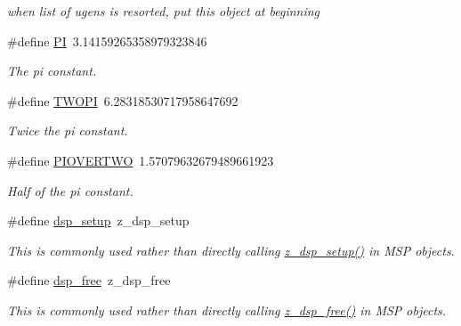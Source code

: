 \begin{DoxyCompactItemize}
\begin{DoxyCompactList}\small\item\em when list of ugens is resorted, put this object at beginning \item\end{DoxyCompactList}\item 
\#define \hyperlink{group__msp_ga598a3330b3c21701223ee0ca14316eca}{PI}~3.14159265358979323846
\begin{DoxyCompactList}\small\item\em The pi constant. \item\end{DoxyCompactList}\item 
\#define \hyperlink{group__msp_ga4912c64aec0c943b7985db6cb61ff83a}{TWOPI}~6.28318530717958647692
\begin{DoxyCompactList}\small\item\em Twice the pi constant. \item\end{DoxyCompactList}\item 
\#define \hyperlink{group__msp_ga54195c4fca76460ca07ba5101bcbc780}{PIOVERTWO}~1.57079632679489661923
\begin{DoxyCompactList}\small\item\em Half of the pi constant. \item\end{DoxyCompactList}\item 
\hypertarget{group__msp_gad15f054306792846a00a5f4e9e5426be}{
\#define \hyperlink{group__msp_gad15f054306792846a00a5f4e9e5426be}{dsp\_\-setup}~z\_\-dsp\_\-setup}
\label{group__msp_gad15f054306792846a00a5f4e9e5426be}

\begin{DoxyCompactList}\small\item\em This is commonly used rather than directly calling \hyperlink{group__msp_ga5c4d70cfb420f13386dd1473143e5825}{z\_\-dsp\_\-setup()} in MSP objects. \item\end{DoxyCompactList}\item 
\hypertarget{group__msp_ga9a981adf6eea7e55d11c1a0b02592a6e}{
\#define \hyperlink{group__msp_ga9a981adf6eea7e55d11c1a0b02592a6e}{dsp\_\-free}~z\_\-dsp\_\-free}
\label{group__msp_ga9a981adf6eea7e55d11c1a0b02592a6e}

\begin{DoxyCompactList}\small\item\em This is commonly used rather than directly calling \hyperlink{group__msp_ga85762f03c915d3860f526a8bf4dd1f3f}{z\_\-dsp\_\-free()} in MSP objects. \item\end{DoxyCompactList}\end{DoxyCompactItemize}
